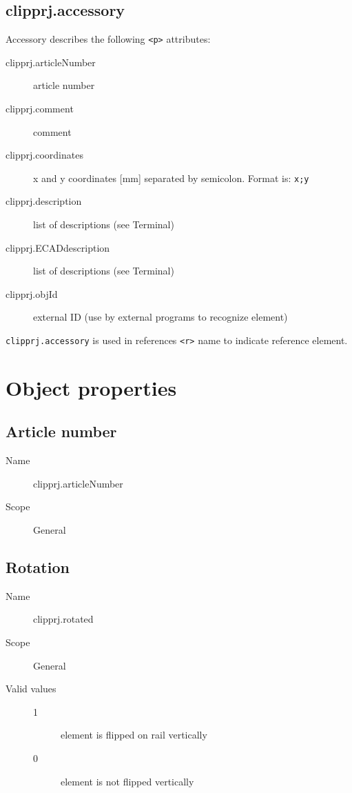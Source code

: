 \documentclass[%
	a4paper,
	oneside,
	listof=numbered,
	parskip=half,
	headsepline=true,
	footsepline=false,
	normalheadings,
	0.7headlines,
	headexclude,
	]{scrbook}
\begin{document}
\subsection{clipprj.accessory}
 
Accessory describes the following \verb|<p>| attributes: 

\begin{description}
	\item[clipprj.articleNumber] article number 
	\item[clipprj.comment] comment 
	\item[clipprj.coordinates] x and y coordinates [mm] separated by semicolon.
	Format is: \verb|x;y|
	\item[clipprj.description] list of descriptions (see Terminal) 
	\item[clipprj.ECADdescription] list of descriptions (see Terminal) 
	\item[clipprj.objId] external ID (use by external programs to recognize element) 
\end{description}

\verb|clipprj.accessory| is used in references \verb|<r>| name to indicate reference element. 

\section{Object properties}

\subsection{Article number}

\begin{description}
	\item[Name] clipprj.articleNumber
	\item[Scope] General
\end{description}

\subsection{Rotation}

\begin{description}
	\item[Name] clipprj.rotated
	\item[Scope] General
	\item[Valid values]
	\begin{description}
		\item[1] element is flipped on rail vertically
		\item[0] element is not flipped vertically
	\end{description}
\end{description}
\end{document}
